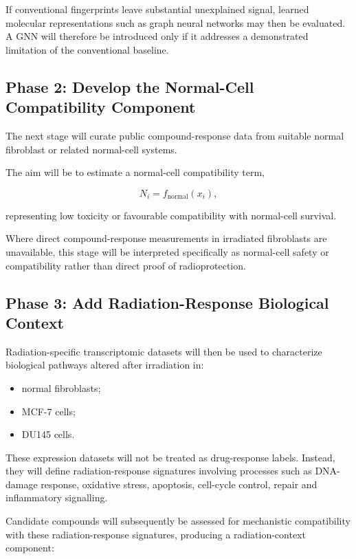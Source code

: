 \documentclass[11pt,a4paper]{article}
\begin{document}
If conventional fingerprints leave substantial unexplained signal, learned molecular representations such as graph neural networks may then be evaluated. A GNN will therefore be introduced only if it addresses a demonstrated limitation of the conventional baseline.

\subsection{Phase 2: Develop the Normal-Cell Compatibility Component}

The next stage will curate public compound-response data from suitable normal fibroblast or related normal-cell systems.

The aim will be to estimate a normal-cell compatibility term,

\[
N_i = f_{\mathrm{normal}}(x_i),
\]

representing low toxicity or favourable compatibility with normal-cell survival.

Where direct compound-response measurements in irradiated fibroblasts are unavailable, this stage will be interpreted specifically as normal-cell safety or compatibility rather than direct proof of radioprotection.

\subsection{Phase 3: Add Radiation-Response Biological Context}

Radiation-specific transcriptomic datasets will then be used to characterize biological pathways altered after irradiation in:

\begin{itemize}[leftmargin=1.6em]
    \item normal fibroblasts;
    \item MCF-7 cells;
    \item DU145 cells.
\end{itemize}

These expression datasets will not be treated as drug-response labels. Instead, they will define radiation-response signatures involving processes such as DNA-damage response, oxidative stress, apoptosis, cell-cycle control, repair and inflammatory signalling.

Candidate compounds will subsequently be assessed for mechanistic compatibility with these radiation-response signatures, producing a radiation-context component:
\end{document}
